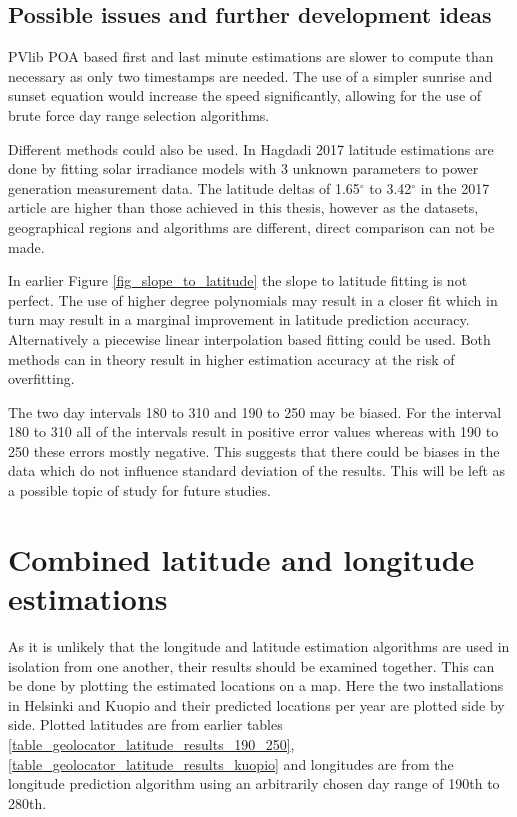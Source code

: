 \clearpage

\subsection{Possible issues and further development ideas}
PVlib POA based first and last minute estimations are slower to compute than necessary as only two timestamps are needed. The use of a simpler sunrise and sunset equation would increase the speed significantly, allowing for the use of brute force day range selection algorithms.

Different methods could also be used. In Hagdadi 2017 \cite{navid_australian_article} latitude estimations are done by fitting solar irradiance models with 3 unknown parameters to power generation measurement data. The latitude deltas of 1.65$^\circ$ to 3.42$^\circ$ in the 2017 article are higher than those achieved in this thesis, however as the datasets, geographical regions and algorithms are different, direct comparison can not be made.


In earlier Figure \ref{fig_slope_to_latitude} the slope to latitude fitting is not perfect. The use of higher degree polynomials may result in a closer fit which in turn may result in a marginal improvement in latitude prediction accuracy. Alternatively a piecewise linear interpolation based fitting could be used. Both methods can in theory result in higher estimation accuracy at the risk of overfitting.
 

The two day intervals 180 to 310 and 190 to 250 may be biased. For the interval 180 to 310 all of the intervals result in positive error values whereas with 190 to 250 these errors mostly negative. This suggests that there could be biases in the data which do not influence standard deviation of the results. This will be left as a possible topic of study for future studies.



\newpage
\section{Combined latitude and longitude estimations}
As it is unlikely that the longitude and latitude estimation algorithms are used in isolation from one another, their results should be examined together. This can be done by plotting the estimated locations on a map. Here the two installations in Helsinki and Kuopio and their predicted locations per year are plotted side by side. Plotted latitudes are from earlier tables \ref{table_geolocator_latitude_results_190_250}, \ref{table_geolocator_latitude_results_kuopio} and longitudes are from the longitude prediction algorithm using an arbitrarily chosen day range of 190th to 280th.

